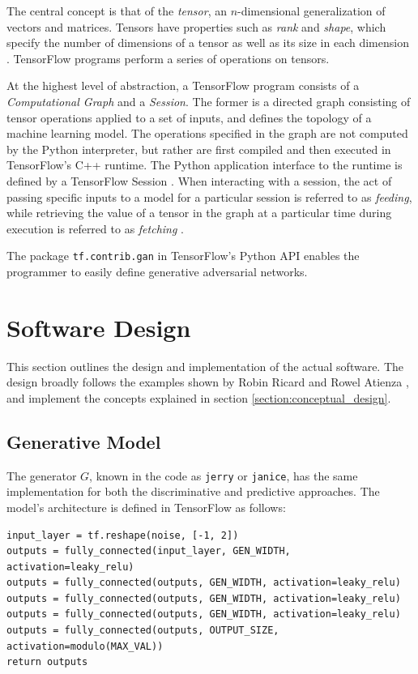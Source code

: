 \documentclass[12pt, titlepage]{report}
\theoremstyle{definition}
\begin{document}
The central concept is that of the \textit{tensor}, an $n$-dimensional generalization of vectors and matrices. Tensors have properties such as \textit{rank} and \textit{shape}, which specify the number of dimensions of a tensor as well as its size in each dimension \cite{tensorflow2018intro}. TensorFlow programs perform a series of operations on tensors.

At the highest level of abstraction, a TensorFlow program consists of a \textit{Computational Graph} and a \textit{Session}. The former is a directed graph consisting of tensor operations applied to a set of inputs, and defines the topology of a machine learning model. The operations specified in the graph are not computed by the Python interpreter, but rather are first compiled and then executed in TensorFlow's C++ runtime. The Python application interface to the runtime is defined by a TensorFlow Session \cite{tensorflow2018graphs}. When interacting with a session, the act of passing specific inputs to a model for a particular session is referred to as \textit{feeding}, while retrieving the value of a tensor in the graph at a particular time during execution is referred to as \textit{fetching} \cite{tensorflow2018intro}.

The package \texttt{tf.contrib.gan} in TensorFlow's Python API enables the programmer to easily define generative adversarial networks.


\section{Software Design}
This section outlines the design and implementation of the actual software. The design broadly follows the examples shown by Robin Ricard \cite{ricard2017generative} and Rowel Atienza \cite{atienza2017gan}, and implement the concepts explained in section \ref{section:conceptual_design}.



\subsection{Generative Model}
The generator $G$, known in the code as \texttt{jerry} or \texttt{janice}, has the same implementation for both the discriminative and predictive approaches. The model's architecture is defined in TensorFlow as follows:

\begin{verbatim}
input_layer = tf.reshape(noise, [-1, 2])
outputs = fully_connected(input_layer, GEN_WIDTH, activation=leaky_relu)
outputs = fully_connected(outputs, GEN_WIDTH, activation=leaky_relu)
outputs = fully_connected(outputs, GEN_WIDTH, activation=leaky_relu)
outputs = fully_connected(outputs, GEN_WIDTH, activation=leaky_relu)
outputs = fully_connected(outputs, OUTPUT_SIZE, activation=modulo(MAX_VAL))
return outputs
\end{verbatim} 
\end{document}
